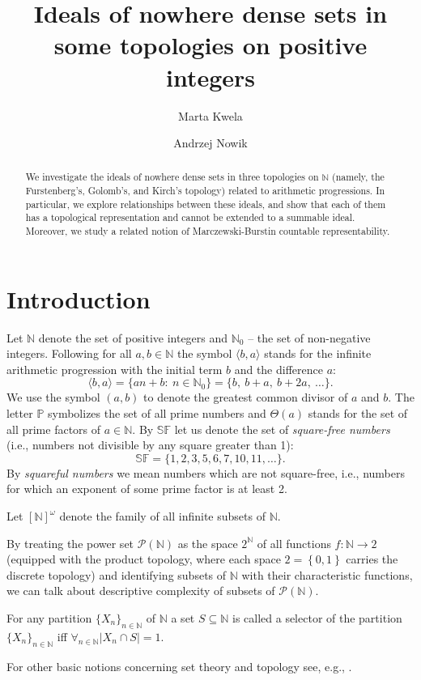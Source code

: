 \documentclass{amsart}
\title[Ideals of nowhere dense sets in some topologies on positive integers]{Ideals of nowhere dense sets in some topologies on positive integers}
\author{Marta Kwela}
\author{Andrzej Nowik}
\theoremstyle{definition}
\newcommand{\N}{{\mathbb N}}
\newcommand{\SqrFr}{\mathbb{SF}}
\newcommand{\InfSubs}{[\N]^{\omega}}
\newcommand{\arithseq}[2]{\langle#2, #1\rangle}
\begin{document}
\begin{abstract}
We investigate the ideals of nowhere dense sets in three topologies on $\N$ (namely, the Furstenberg's, Golomb's, and Kirch's topology) related to arithmetic progressions. In particular, we explore relationships between these ideals, and show that each of them has a topological representation and cannot be extended to a summable ideal. Moreover, we study a related notion of Marczewski-Burstin countable representability.
\end{abstract}
\maketitle


\section{Introduction}

Let $\N$ denote the set of positive integers and $\N_0$ -- the set of non-negative integers. Following \cite{K} for all $a,b\in\N$ the symbol $\arithseq{a}{b}$ stands for the infinite arithmetic progression with the initial term $b$ and the difference $a$:
$$\arithseq{a}{b} = \{an+b :\ n\in\N_0\} = \{b,\ b+a,\ b+2a,\ \ldots\}. $$
We use the symbol $(a,b)$ to denote the greatest common divisor of $a$ and $b$. 
The letter $\mathbb{P}$ symbolizes the set of all prime numbers and $\Theta(a)$ stands for the set of all prime factors of $a\in\N$.
By $\mathbb{SF}$ let us denote the set of \emph{square-free numbers} (i.e., numbers not divisible by any square greater than 1):
$$\SqrFr = \{1,2,3,5,6,7,10,11,\ldots\}.$$
By \emph{squareful numbers} we mean numbers which are not square-free, i.e., numbers for which an exponent of some prime factor is at least 2.

Let $\InfSubs$ denote the family of all infinite subsets of $\N$. 

By treating the power set $\mathcal{P}(\N)$ as the space $2^\N$ of all functions $f\colon\N\to 2$ (equipped with the product topology, where each space $2= \left\{0,1\right\}$ carries the discrete topology) and identifying subsets of $\N$ with their characteristic functions, we can talk about descriptive complexity of subsets of $\mathcal{P}(\N)$.

For any partition $\{X_n\}_{n\in\N}$ of $\N$ a set $S\subseteq\N$
is called a selector of the partition $\{X_n\}_{n\in\N}$ iff
$\forall_{n\in\N} |X_n \cap S| = 1$. 

For other basic notions concerning set theory and topology see, e.g., \cite{Kechris}.
\end{document}
